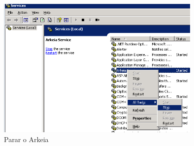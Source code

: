 \begin{figure}[H]
    \begin{center}
        \includegraphics[width=10cm]{include/img/ark-win-stop}
    \end{center}
    \caption{Parar o Arkeia}
    \label{fig:ARK-WIN2}
\end{figure}



